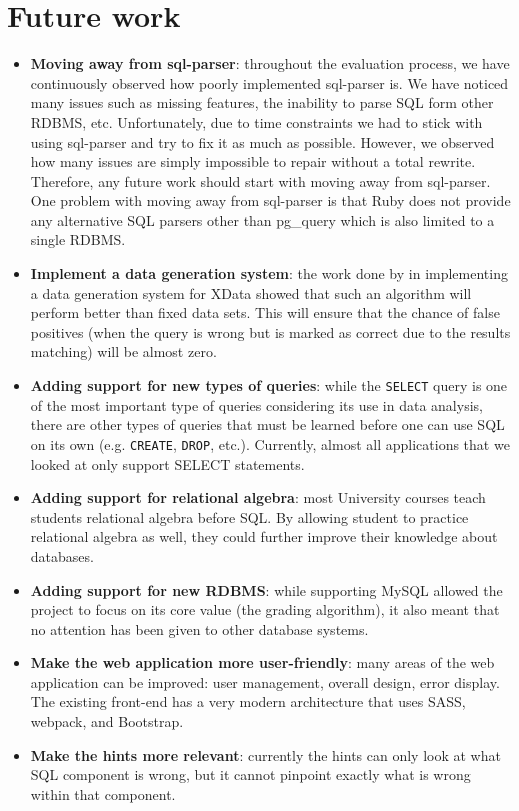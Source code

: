 \section{Future work}
\begin{itemize}
    \item \textbf{Moving away from sql-parser}: throughout the evaluation process, we have continuously observed how poorly implemented sql-parser is. We have noticed many issues such as missing features, the inability to parse SQL form other RDBMS, etc. Unfortunately, due to time constraints we had to stick with using sql-parser and try to fix it as much as possible. However, we observed how many issues are simply impossible to repair without a total rewrite. Therefore, any future work should start with moving away from sql-parser. One problem with moving away from sql-parser is that Ruby does not provide any alternative SQL parsers other than pg\_query which is also limited to a single RDBMS.
    \item \textbf{Implement a data generation system}: the work done by \citet{lit:xdata_d} in implementing a data generation system for XData showed that such an algorithm will perform better than fixed data sets. This will ensure that the chance of false positives (when the query is wrong but is marked as correct due to the results matching) will be almost zero.
    \item \textbf{Adding support for new types of queries}: while the \texttt{SELECT} query is one of the most important type of queries considering its use in data analysis, there are other types of queries that must be learned before one can use SQL on its own (e.g. \texttt{CREATE}, \texttt{DROP}, etc.). Currently, almost all applications that we looked at only support SELECT statements.
    \item \textbf{Adding support for relational algebra}: most University courses teach students relational algebra before SQL. By allowing student to practice relational algebra as well, they could further improve their knowledge about databases.
    \item \textbf{Adding support for new RDBMS}: while supporting MySQL allowed the project to focus on its core value (the grading algorithm), it also meant that no attention has been given to other database systems.
    \item \textbf{Make the web application more user-friendly}: many areas of the web application can be improved: user management, overall design, error display. The existing front-end has a very modern architecture that uses SASS, webpack, and Bootstrap.
    \item \textbf{Make the hints more relevant}: currently the hints can only look at what SQL component is wrong, but it cannot pinpoint exactly what is wrong within that component.
\end{itemize}